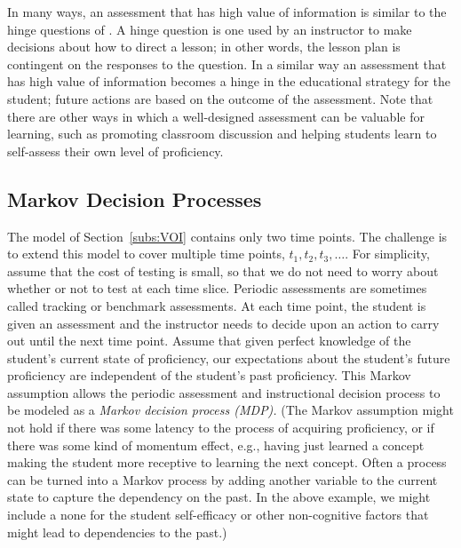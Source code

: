 \documentclass[12pt]{RR-article}
\begin{document}
In many ways, an assessment that has high value of information is
similar to the hinge questions of .  A hinge
question is one used by an instructor to make decisions about how to
direct a lesson; in other words, the lesson plan is contingent on the
responses to the question.  In a similar way an assessment that has
high value of information becomes a hinge in the educational strategy
for the student;  future actions are based on the outcome of
the assessment.  Note that there are other ways in which
a well-designed assessment can be valuable for learning, such as
promoting classroom discussion and helping students learn to
self-assess their own level of proficiency.


\subsection{Markov Decision Processes}
\label{subs:Markov}

The model of Section~\ref{subs:VOI} contains only two time points.
The challenge is to extend this model to cover multiple time points,
$t_1, t_2, t_3, \ldots$.  For simplicity, assume that the cost of
testing is small, so that we do not need to worry about whether or not
to test at each time slice.  Periodic assessments are sometimes called
tracking or benchmark assessments.  At each time point, the student is
given an assessment and the instructor needs to decide upon an action
to carry out until the next time point.  Assume that given perfect
knowledge of the student's current state of proficiency, our
expectations about the student's future proficiency are independent of
the student's past proficiency.  This Markov assumption allows the
periodic assessment and instructional decision process to be modeled
as a {\it Markov decision process (MDP).\/}  (The Markov assumption might not hold if there was some
latency to the process of acquiring proficiency, or if there was some
kind of momentum effect, e.g., having just learned a concept making the
student more receptive to learning the next concept.  Often a process
can be turned into a Markov process by adding another variable to the
current state to capture the dependency on the past.  In the above
example, we might include a none for the student self-efficacy or
other non-cognitive factors that might lead to dependencies to the
past.)
\end{document}
